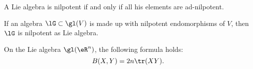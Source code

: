 \begin{theorem}\label{tho:Engel}
    A Lie algebra is nilpotent if and only if all his elements are ad-nilpotent.
\end{theorem}



\begin{proposition}\label{PropBDrongP}
    If an algebra $\lG\subset\gl(V)$ is made up with nilpotent endomorphisms of $V$, then $\lG$ is nilpotent as Lie algebra.
\end{proposition}

\begin{proposition} \label{PropKillingTraceDeuxn}
    On the Lie algebra \( \gl(\eR^n)\), the following formula holds:
    \begin{equation}
       B(X,Y)=2n\tr(XY).
    \end{equation}
\end{proposition}

